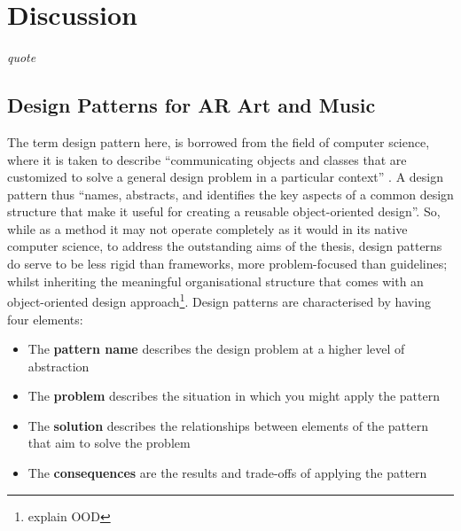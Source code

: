 \chapter{Discussion}
\label{sec: discussion}
\epigraph{\emph{quote}}{\citep[]{bilbow2022}}
\section{Design Patterns for AR Art and Music} \label{sec: discussion-patterns} %

The term design pattern here, is borrowed from the field of computer science, where it is taken to describe ``communicating objects and classes that are customized to solve a general design problem in a particular context'' \citep{gamma1995}. A design pattern thus ``names, abstracts, and identifies the key aspects of a common design structure that make it useful for creating a reusable object-oriented design''. So, while as a method it may not operate completely as it would in its native computer science, to address the outstanding aims of the thesis, design patterns do serve to be less rigid than frameworks, more problem-focused than guidelines; whilst inheriting the meaningful organisational structure that comes with an object-oriented design approach\footnote{explain OOD}. Design patterns are characterised by having four elements:
\begin{itemize}
    \item The \textbf{pattern name} describes the design problem at a higher level of abstraction
    \item The \textbf{problem} describes the situation in which you might apply the pattern
    \item The \textbf{solution} describes the relationships between elements of the pattern that aim to solve the problem
    \item The \textbf{consequences} are the results and trade-offs of applying the pattern
\end{itemize}

